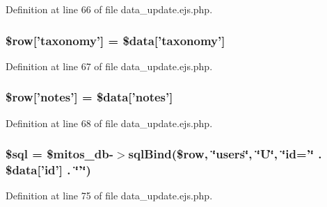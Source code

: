 \-Definition at line 66 of file data\-\_\-update.\-ejs.\-php.

\hypertarget{miscellaneous_2addressbook_2data__update_8ejs_8php_ac3ee7cf124d7401bbb138317989b316c}{
\subsubsection[{\$row}]{\setlength{\rightskip}{0pt plus 5cm}\$row\mbox{[}'taxonomy'\mbox{]} = \$data\mbox{[}'taxonomy'\mbox{]}}}\label{miscellaneous_2addressbook_2data__update_8ejs_8php_ac3ee7cf124d7401bbb138317989b316c}


\-Definition at line 67 of file data\-\_\-update.\-ejs.\-php.

\hypertarget{miscellaneous_2addressbook_2data__update_8ejs_8php_a6cd140f95df717cfed217fe478482645}{
\subsubsection[{\$row}]{\setlength{\rightskip}{0pt plus 5cm}\$row\mbox{[}'notes'\mbox{]} = \$data\mbox{[}'notes'\mbox{]}}}\label{miscellaneous_2addressbook_2data__update_8ejs_8php_a6cd140f95df717cfed217fe478482645}


\-Definition at line 68 of file data\-\_\-update.\-ejs.\-php.

\hypertarget{miscellaneous_2addressbook_2data__update_8ejs_8php_a047170d6020a882807665812a27e2525}{
\subsubsection[{\$sql}]{\setlength{\rightskip}{0pt plus 5cm}\$sql = \$mitos\-\_\-db-\/$>$sql\-Bind(\$row, \char`\"{}users\char`\"{}, \char`\"{}\-U\char`\"{}, \char`\"{}id='\char`\"{} . \$data\mbox{[}'id'\mbox{]} . \char`\"{}'\char`\"{})}}\label{miscellaneous_2addressbook_2data__update_8ejs_8php_a047170d6020a882807665812a27e2525}


\-Definition at line 75 of file data\-\_\-update.\-ejs.\-php.

